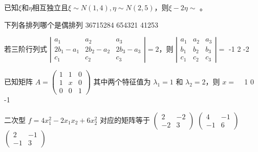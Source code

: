 \documentclass[noanswer]{USTBExam}
\begin{document}
\begin{problem}
已知$\xi$和$\eta$相互独立且$\xi\sim N(1,4), \eta\sim N(2,5)$，则$\xi-2\eta\sim$ 。
\end{problem}




\begin{problem}
下列各排列哪个是偶排列 
	{36715284}
	{654321}
	{41253}
\end{problem}


\begin{problem}
若三阶行列式 $\left|\begin{array}{ccc}
  a_1 & a_2 & a_3\\
  2 b_1 - a_1 & 2 b_2 - a_2 & 2 b_3 - a_3\\
  c_1 & c_2 & c_3
\end{array}\right| = 2$，则 $\left|\begin{array}{ccc}
  a_1 & a_2 & a_3\\
  b_1 & b_2 & b_3\\
  c_1 & c_2 & c_3
\end{array}\right|=$ 
	{-1}
	{2}
	{-2}
\end{problem}


\begin{problem}
已知矩阵 $A = \left(\begin{array}{ccc}
  1 & 1 & 0\\
  1 & x & 0\\
  0 & 0 & 1
\end{array}\right)$ 其中两个特征值为 $\lambda_1 = 1$ 和 $\lambda_2
= 2$，则 $x=$ ~
	{1}
	{0}
	{-1}
\end{problem}


\begin{problem}
二次型 $f = 4 x_1^2 - 2 x_1 x_2 + 6 x_2^2$ 对应的矩阵等于 
	{$\left(\begin{array}{cc}
  2 & - 2\\
  - 2 & 3
\end{array}\right)$}
	{$\left(\begin{array}{cc}
  4 & - 1\\
  - 1 & 6
\end{array}\right)$}
	{$\left(\begin{array}{cc}
  2 & - 1\\
  - 1 & 3
\end{array}\right)$}
\end{problem}
\end{document}

